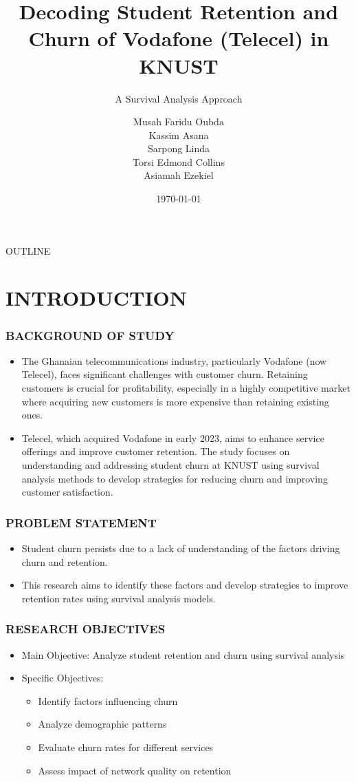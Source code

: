 \documentclass{beamer}
\title{Decoding Student Retention and Churn of Vodafone (Telecel) in KNUST}
\subtitle{A Survival Analysis Approach}
\author{Musah Faridu Oubda
	\\ Kassim Asana
	\\ Sarpong Linda
	\\ Torsi Edmond Collins
	\\ Asiamah Ezekiel}
\institute{Kwame Nkrumah University of Science and Technology}
\date{\today}
\begin{document}
	\begin{frame}
		\titlepage
	\end{frame}
	
	\begin{frame}{OUTLINE}
		\tableofcontents
	\end{frame}
	
	
	\section{INTRODUCTION}
	
	\begin{frame}
		\frametitle{BACKGROUND OF STUDY}
		\begin{itemize}
			
			
			\item 	The Ghanaian telecommunications industry, particularly Vodafone (now Telecel), faces significant challenges with customer churn. Retaining customers is crucial for profitability, especially in a highly competitive market where acquiring new customers is more expensive than retaining existing ones.
			\item 	
			Telecel, which acquired Vodafone in early 2023, aims to enhance service offerings and improve customer retention. The study focuses on understanding and addressing student churn at KNUST using survival analysis methods to develop strategies for reducing churn and improving customer satisfaction.
			
		\end{itemize}
	\end{frame}
	
	\begin{frame}
		\frametitle{PROBLEM STATEMENT}
		\begin{itemize}
			\item Student churn persists due to a lack of understanding of the factors driving churn and retention. 
			\item This research aims to identify these factors and develop strategies to improve retention rates using survival analysis models.
			
			
		\end{itemize}
	\end{frame}
	
	\begin{frame}
		\frametitle{RESEARCH OBJECTIVES}
		\begin{itemize}
			\item Main Objective: Analyze student retention and churn using survival analysis
			\item Specific Objectives:
			\begin{itemize}
				\item Identify factors influencing churn
				\item Analyze demographic patterns
				\item Evaluate churn rates for different services
				\item Assess impact of network quality on retention
			\end{itemize}
		\end{itemize}
	\end{frame}
	
\end{document}

